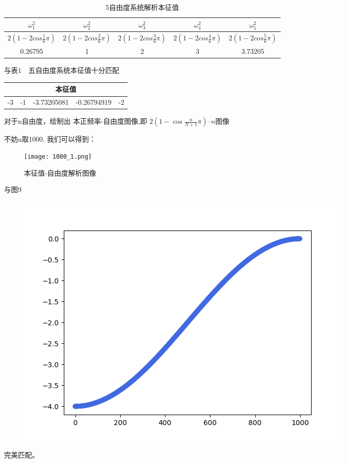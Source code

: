 \documentclass[11pt, a4paper, oneside]{ctexart}
\begin{document}
{{{%
\begin{table}[h]
    \centering
    \caption{5自由度系统解析本征值}
    \begin{tabular}{@{}ccccc@{}}
    \toprule
    $\omega_1^2$              & $\omega_2^2$              & $\omega_3^2$              & $\omega_4^2$              & $\omega_5^2$              \\ \midrule
    $2(1-2cos\frac{1}{6}\pi)$ & $2(1-2cos\frac{2}{6}\pi)$ & $2(1-2cos\frac{3}{6}\pi)$ & $2(1-2cos\frac{4}{6}\pi)$ & $2(1-2cos\frac{5}{6}\pi)$ \\ \midrule
    0.26795                   & 1                         & 2                         & 3                         & 3.73205                   \\ \bottomrule
    \end{tabular}
    \end{table}
与表$1\quad${五自由度系统本征值}十分匹配
\begin{table}[h]
    \centering
    \begin{tabular}{@{}p{2cm}<{\centering}p{2cm}<{\centering}p{2cm}<{\centering}p{2cm}<{\centering}p{2cm}<{\centering}@{}}
    \toprule
    \multicolumn{5}{c}{本征值}                  \\ \midrule
    -3 & -1 & -3.73205081 & -0.26794919 & -2 \\ \bottomrule
    \end{tabular}
    \end{table}

对于n自由度，绘制出 本正频率-自由度图像,即
 ${2 }\left(1-\cos\frac{n}{N+1} \pi\right)$--$n$图像

 不妨n取1000.
我们可以得到：
  \begin{figure}[H]
        
    \centering
    \vspace{2mm}
    \texttt{[image: 1000\_1.png]}
    \caption{本征值-自由度解析图像}
\end{figure} 
与图9
 \begin{figure}[H]
        
    \centering
    \vspace{2mm}
    \includegraphics[scale=0.45]{v-1000.png}
\end{figure} 
完美匹配。

}}}
\end{document}
